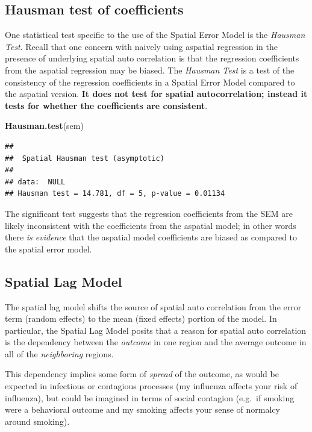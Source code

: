 \documentclass[
]{book}
\newenvironment{Shaded}{\begin{snugshade}}{\end{snugshade}}
\newcommand{\FunctionTok}[1]{\textcolor[rgb]{0.13,0.29,0.53}{\textbf{#1}}}
\newcommand{\NormalTok}[1]{#1}
\begin{document}
\hypertarget{hausman-test-of-coefficients}{%
\subsection{Hausman test of coefficients}\label{hausman-test-of-coefficients}}

One statistical test specific to the use of the Spatial Error Model is the \emph{Hausman Test}. Recall that one concern with naively using aspatial regression in the presence of underlying spatial auto correlation is that the regression coefficients from the aspatial regression may be biased. The \emph{Hausman Test} is a test of the consistency of the regression coefficients in a Spatial Error Model compared to the aspatial version. \textbf{It does not test for spatial autocorrelation; instead it tests for whether the coefficients are consistent}.

\begin{Shaded}
\begin{Highlighting}[]
\FunctionTok{Hausman.test}\NormalTok{(sem)}
\end{Highlighting}
\end{Shaded}

\begin{verbatim}
## 
##  Spatial Hausman test (asymptotic)
## 
## data:  NULL
## Hausman test = 14.781, df = 5, p-value = 0.01134
\end{verbatim}

The significant test suggests that the regression coefficients from the SEM are likely inconsistent with the coefficients from the aspatial model; in other words there \emph{is evidence} that the aspatial model coefficients are biased as compared to the spatial error model.

\hypertarget{spatial-lag-model}{%
\subsection{Spatial Lag Model}\label{spatial-lag-model}}

The spatial lag model shifts the source of spatial auto correlation from the error term (random effects) to the mean (fixed effects) portion of the model. In particular, the Spatial Lag Model posits that a reason for spatial auto correlation is the dependency between the \emph{outcome} in one region and the average outcome in all of the \emph{neighboring} regions.

This dependency implies some form of \emph{spread} of the outcome, as would be expected in infectious or contagious processes (my influenza affects your risk of influenza), but could be imagined in terms of social contagion (e.g.~if smoking were a behavioral outcome and my smoking affects your sense of normalcy around smoking).
\end{document}
